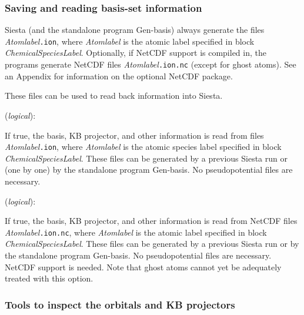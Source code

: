 \documentclass[11pt]{article}
\begin{document}
\subsubsection{Saving and reading basis-set information}

{\sc Siesta} (and the standalone program {\sc Gen-basis})
always generate the files
{\it Atomlabel}{\tt .ion}, where {\it Atomlabel} is the atomic label
specified in block {\it ChemicalSpeciesLabel}.  Optionally, if
NetCDF support is compiled in, the programs generate
NetCDF files 
{\it Atomlabel}{\tt .ion.nc} (except for ghost atoms).
See an Appendix for information on the optional NetCDF package.

These files can be used to read back information into {\sc Siesta}.

\begin{description}
\itemsep 10pt
\parsep 0pt
\item[{\bf User.Basis}] ({\it logical}):

If true, the basis, KB projector, and other information is read from
files {\it Atomlabel}{\tt .ion}, where {\it Atomlabel} is the atomic
species label specified in block {\it ChemicalSpeciesLabel}. These
files can be generated by a previous {\sc Siesta} run or (one by one) by the
standalone program {\sc Gen-basis}. No pseudopotential
files are necessary.

\item[{\bf User.Basis.NetCDF}] ({\it logical}):

If true, the basis, KB projector, and other information is read from
NetCDF files {\it Atomlabel}{\tt .ion.nc}, where {\it Atomlabel} is
the atomic label specified in block {\it ChemicalSpeciesLabel}. These
files can be generated by a previous {\sc Siesta} run or by the
standalone program {\sc Gen-basis}. No pseudopotential
files are necessary. NetCDF support is needed. Note that ghost atoms
cannot yet be adequately treated with this option.

\end{description}

\subsubsection{Tools to inspect the orbitals and KB projectors}
\end{document}
